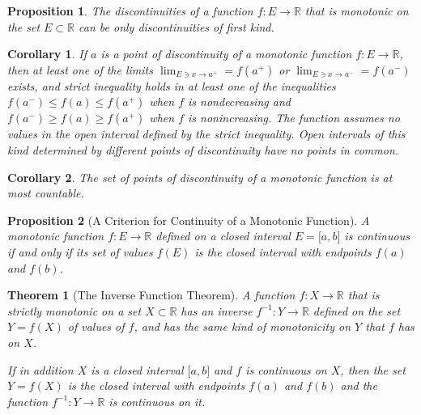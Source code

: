 \documentclass[onecolumn]{ctexart}
\newtheorem{theorem}{Theorem}
\newtheorem{proposition}{Proposition}
\newtheorem{corollary}{Corollary}
\begin{document}
\begin{proposition}
  The discontinuities of a function $f:E \to \mathbb{R}$ that is monotonic on 
  the set $E \subset \mathbb{R}$ can be only discontinuities of first kind.
\end{proposition}

\begin{corollary}
  If $a$ is a point of discontinuity of a monotonic function $f:E \to \mathbb{R}$, 
  then at least one of the limits $\lim_{E \owns x \to a^+} = f(a^+)$ or 
  $\lim_{E \owns x \to a^-} = f(a^-)$ exists, and strict inequality holds in at 
  least one of the inequalities $f(a^-) \leq f(a) \leq f(a^+)$ when $f$ is 
  nondecreasing and $f(a^-) \geq f(a) \geq f(a^+)$ when $f$ is nonincreasing. 
  The function assumes no values in the open interval defined by the strict 
  inequality. Open intervals of this kind determined by different points of 
  discontinuity have no points in common.
\end{corollary}

\begin{corollary}
  The set of points of discontinuity of a monotonic function is at most 
  countable.
\end{corollary}

\begin{proposition}[A Criterion for Continuity of a Monotonic Function]
  A monotonic function $f:E \to \mathbb{R}$ defined on a closed interval 
  $E = \lbrack a,b \rbrack$ is continuous if and only if its set of values 
  $f(E)$ is the closed interval with endpoints $f(a)$ and $f(b)$.
\end{proposition}

\begin{theorem}[The Inverse Function Theorem]
  A function $f:X \to \mathbb{R}$ that is strictly monotonic on a set $X \subset 
  \mathbb{R}$ has an inverse $f^{-1}: Y \to \mathbb{R}$ defined on the set $Y = 
  f(X)$ of values of $f$, and has the same kind of monotonicity on $Y$ that $f$ 
  has on $X$.

  If in addition $X$ is a closed interval $\lbrack a,b \rbrack$ and $f$ is 
  continuous on $X$, then the set $Y = f(X)$ is the closed interval with 
  endpoints $f(a)$ and $f(b)$ and the function $f^{-1}: Y \to \mathbb{R}$ is 
  continuous on it.
\end{theorem}
\end{document}
